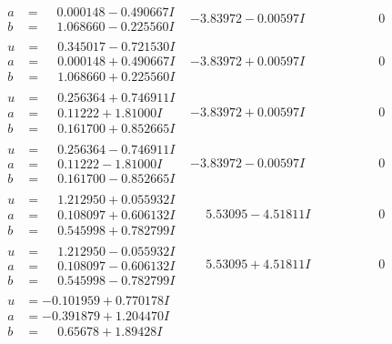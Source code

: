 \documentclass[1p]{elsarticle_modified}
\theoremstyle{definition}
\begin{document}
$$\begin{array}{c|c|c}
\begin{aligned}
a &= \phantom{-}0.000148 - 0.490667 I \\
b &= \phantom{-}1.068660 - 0.225560 I\end{aligned}
 & -3.83972 - 0.00597 I & \phantom{-0.000000 } 0 \\ \hline\begin{aligned}
u &= \phantom{-}0.345017 - 0.721530 I \\
a &= \phantom{-}0.000148 + 0.490667 I \\
b &= \phantom{-}1.068660 + 0.225560 I\end{aligned}
 & -3.83972 + 0.00597 I & \phantom{-0.000000 } 0 \\ \hline\begin{aligned}
u &= \phantom{-}0.256364 + 0.746911 I \\
a &= \phantom{-}0.11222 + 1.81000 I \\
b &= \phantom{-}0.161700 + 0.852665 I\end{aligned}
 & -3.83972 + 0.00597 I & \phantom{-0.000000 } 0 \\ \hline\begin{aligned}
u &= \phantom{-}0.256364 - 0.746911 I \\
a &= \phantom{-}0.11222 - 1.81000 I \\
b &= \phantom{-}0.161700 - 0.852665 I\end{aligned}
 & -3.83972 - 0.00597 I & \phantom{-0.000000 } 0 \\ \hline\begin{aligned}
u &= \phantom{-}1.212950 + 0.055932 I \\
a &= \phantom{-}0.108097 + 0.606132 I \\
b &= \phantom{-}0.545998 + 0.782799 I\end{aligned}
 & \phantom{-}5.53095 - 4.51811 I & \phantom{-0.000000 } 0 \\ \hline\begin{aligned}
u &= \phantom{-}1.212950 - 0.055932 I \\
a &= \phantom{-}0.108097 - 0.606132 I \\
b &= \phantom{-}0.545998 - 0.782799 I\end{aligned}
 & \phantom{-}5.53095 + 4.51811 I & \phantom{-0.000000 } 0 \\ \hline\begin{aligned}
u &= -0.101959 + 0.770178 I \\
a &= -0.391879 + 1.204470 I \\
b &= \phantom{-}0.65678 + 1.89428 I\end{aligned}

\end{array}$$
\end{document}
